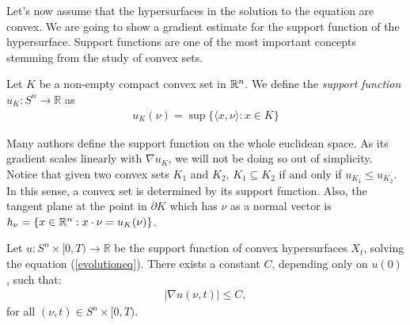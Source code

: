 Let's now assume that the hypersurfaces in the solution to the equation are convex. We are going to show a gradient estimate for the support function of the hypersurface. Support functions are one of the most important concepts stemming from the study of convex sets. 
\begin{defin}
	Let $K$ be a non-empty compact convex set in $\mathbb{R}^n$. We define the {\em support function} $u_K:  S^n \to \mathbb{R} $ as 
	\begin{align*}
		u_K (\nu) = \sup\{\langle x, \nu \rangle : x\in K \}
	\end{align*}
\end{defin}

\begin{oss}
	Many authors define the support function on the whole euclidean space. As its gradient scales linearly with $\nabla u_K$, we will not be doing so out of simplicity. Notice that given two convex sets $K_1$ and $K_2$, $K_1 \subseteq K_2$ if and only if   $u_{K_1} \leq u_{K_2}$. In this sense, a convex set is determined by its support function. Also, the tangent plane at the point in $\partial K$ which has $\nu$ as a normal vector is  $h_\nu=\{x\in \mathbb{R}^n : x \cdot \nu = u_K (\nu)\}$. 
\end{oss}

\begin{cor}
	Let $ u : S^n \times [0, T) \to \mathbb{R} $ be the support function of convex hypersurfaces $ X_t $, solving the equation  (\ref{evolutioneq}). There exists a constant $ C $, depending only on $ u(0) $, such that:
	\begin{align*}
		|\nabla u(\nu, t)| \leq C,
	\end{align*}
	for all $ (\nu, t) \in S^n \times [0, T)$.
\end{cor}


